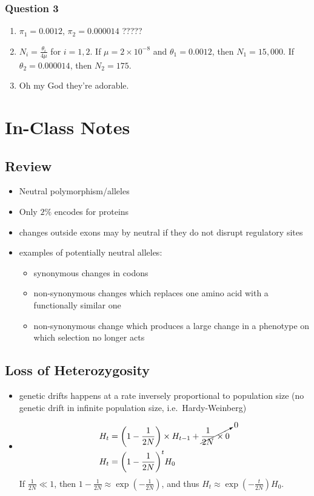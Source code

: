 \documentclass{article}
\begin{document}
        \subsubsection*{Question 3}
            \begin{enumerate}[\bf\ \ A)]
                \item $\pi_1 = 0.0012$, $\pi_2 = 0.000014$ ?????
                \item $N_i = \frac{\theta_i}{4\mu}$ for $i = 1,2$.  If $\mu = 2\times10^{-8}$ and $\theta_1 = 0.0012$, then $N_1 = 15,000$.  If $\theta_2 = 0.000014$, then $N_2 = 175$.
                \item Oh my God they're adorable.
            \end{enumerate}

    \section{In-Class Notes}
        \subsection{Review}
            \begin{itemize}
                \item Neutral polymorphism/alleles
                \item Only $2\%$ encodes for proteins
                \item changes outside exons may by neutral if they do not disrupt regulatory sites
                \item examples of potentially neutral alleles:
                \begin{itemize}
                    \item synonymous changes in codons
                    \item non-synonymous changes which replaces one amino acid with a functionally similar one
                    \item non-synonymous change which produces a large change in a phenotype on which selection no longer acts
                \end{itemize}
            \end{itemize}
        \subsection{Loss of Heterozygosity}
            \begin{itemize}
                \item genetic drifts happens at a rate inversely proportional to population size (no genetic drift in infinite population size, i.e.~Hardy-Weinberg)
                \item
                \begin{align*}
                    H_t &= \qty(1 - \frac{1}{2N})\times H_{t-1} + \cancelto{0}{\frac{1}{2N}\times0} \\
                    H_t &= \qty(1 - \frac{1}{2N})^tH_0
                \end{align*}
                If $\frac{1}{2N} \ll 1$, then $1 - \frac{1}{2N} \approx \exp(-\frac{1}{2N})$, and thus $H_t \approx \exp(-\frac{t}{2N})H_0$.
            \end{itemize}
\end{document}
